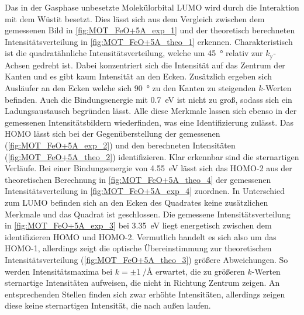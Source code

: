            Das in der Gasphase unbesetzte Molekülorbital LUMO wird durch die Interaktion mit dem Wüstit besetzt.
            Dies lässt sich aus dem Vergleich zwischen dem gemessenen Bild in \autoref{fig:MOT_FeO+5A_exp_1} und der theoretisch berechneten Intensitätsverteilung in \autoref{fig:MOT_FeO+5A_theo_1} erkennen.
            Charakteristisch ist die quadratähnliche Intensitätsverteilung, welche um \SI{45}{\degree} relativ zur $k_\text{y}$-Achsen gedreht ist.
            Dabei konzentriert sich die Intensität auf das Zentrum der Kanten und es gibt kaum Intensität an den Ecken.
            Zusätzlich ergeben sich Ausläufer an den Ecken welche sich \SI{90}{\degree} zu den Kanten zu steigenden $k$-Werten befinden.
            Auch die Bindungsenergie mit \SI{0.7}{\electronvolt} ist nicht zu groß, sodass sich ein Ladungsaustausch begründen lässt.
            Alle diese Merkmale lassen sich ebenso in der gemessenen Intensitätsbildern wiederfinden, was eine Identifizierung zulässt.
            Das HOMO lässt sich bei der Gegenüberstellung der gemessenen (\autoref{fig:MOT_FeO+5A_exp_2}) und den berechneten Intensitäten (\autoref{fig:MOT_FeO+5A_theo_2}) identifizieren.
            Klar erkennbar sind die sternartigen Verläufe. %
            Bei einer Bindungsenergie von \SI{4.55}{\electronvolt} lässt sich das HOMO-2 aus der theoretischen Berechnung in \autoref{fig:MOT_FeO+5A_theo_4} der gemessenen Intensitätsverteilung in \autoref{fig:MOT_FeO+5A_exp_4} zuordnen.
            In Unterschied zum LUMO befinden sich an den Ecken des Quadrates keine zusätzlichen Merkmale und das Quadrat ist geschlossen.
            Die gemessene Intensitätsverteilung in \autoref{fig:MOT_FeO+5A_exp_3} bei \SI{3.35}{\electronvolt} liegt energetisch zwischen dem identifizieren HOMO und HOMO-2.
            Vermutlich handelt es sich also um das HOMO-1, allerdings zeigt die optische Übereinstimmung zur theoretischen Intensitätsverteilung (\autoref{fig:MOT_FeO+5A_theo_3}) größere Abweichungen.
            So werden Intensitätsmaxima bei $k= \pm\SI[per-mode=reciprocal]{1}{\per\angstrom}$ erwartet, die zu größeren $k$-Werten sternartige Intensitäten aufweisen, die nicht in Richtung Zentrum zeigen.
            An entsprechenden Stellen finden sich zwar erhöhte Intensitäten, allerdings zeigen diese keine sternartigen Intensität, die nach außen laufen.
